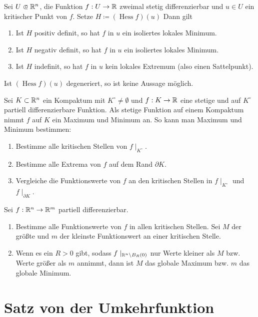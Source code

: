 \documentclass{cheat-sheet}
\DeclareMathOperator{\Hess}{Hess} %
\begin{document}
\begin{satz}
  Sei $U \opn \R^n$, die Funktion $f : U \to \mathbb{R}$ zweimal stetig differenzierbar und $u \in U$ ein kritischer Punkt von $f$. Setze $H \coloneqq (\Hess f)(u)$ Dann gilt
  \begin{enumerate}
    \item Ist $H$ positiv definit, so hat $f$ in $u$ ein isoliertes lokales Minimum.
    \item Ist $H$ negativ definit, so hat $f$ in $u$ ein isoliertes lokales Minimum.
    \item Ist $H$ indefinit, so hat $f$ in $u$ kein lokales Extremum (also einen Sattelpunkt).
  \end{enumerate}
\end{satz}

\begin{acht}
  Ist $(\Hess f)(u)$ degeneriert, so ist keine Aussage möglich.
\end{acht}

\begin{strat}
  Sei $K \subset \mathbb{R}^n$ ein Kompaktum mit $K^{\circ} \not= \emptyset$ und $f : K \to \mathbb{R}$ eine stetige und auf $K^{\circ}$ partiell differenzierbare Funktion. Als stetige Funktion auf einem Kompaktum nimmt $f$ auf $K$ ein Maximum und Minimum an. So kann man Maximum und Minimum bestimmen:
  \begin{enumerate}
    \item Bestimme alle kritischen Stellen von $f\mid_{K^{\circ}}$.
    \item Bestimme alle Extrema von $f$ auf dem Rand $\partial K$.
    \item Vergleiche die Funktionswerte von $f$ an den kritischen Stellen in $f\mid_{K^{\circ}}$ und $f\mid_{\partial K}$.
  \end{enumerate}
\end{strat}

\begin{samepage}

\begin{strat}
  Sei $f : \mathbb{R}^n \to \mathbb{R}^m$ partiell differenzierbar.
  \begin{enumerate}
    \item Bestimme alle Funktionswerte von $f$ in allen kritischen Stellen. Sei $M$ der größte und $m$ der kleinste Funktionswert an einer kritischen Stelle.
    \item Wenn es ein $R > 0$ gibt, sodass $f\mid_{\mathbb{R}^n \backslash B_R(0)}$ nur Werte kleiner als $M$ bzw. Werte größer als $m$ annimmt, dann ist $M$ das globale Maximum bzw. $m$ das globale Minimum.
  \end{enumerate}
\end{strat}


\section{Satz von der Umkehrfunktion}

\end{samepage}
\end{document}
